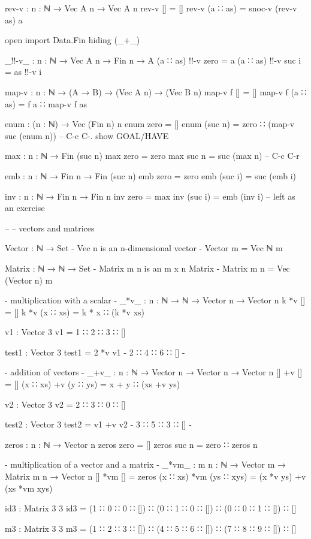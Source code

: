 rev-v : {n : ℕ} → Vec A n → Vec A n
rev-v [] = []
rev-v (a ∷ as) = snoc-v (rev-v as) a

open import Data.Fin hiding (_+_)

_!!-v_ : {n : ℕ} → Vec A n → Fin n → A
(a ∷ as) !!-v zero = a
(a ∷ as) !!-v suc i = as !!-v i

map-v : {n : ℕ} → (A → B) → (Vec A n) → (Vec B n)
map-v f [] = []
map-v f (a ∷ as) = f a ∷ map-v f as

enum : (n : ℕ) → Vec (Fin n) n
enum zero = []
enum (suc n) = zero ∷ (map-v suc (enum n)) -- C-c C-. show GOAL/HAVE

max : {n : ℕ} → Fin (suc n)
max {zero} = zero
max {suc n} = suc (max {n}) -- C-c C-r

emb : {n : ℕ} → Fin n → Fin (suc n)
emb zero = zero
emb (suc i) = suc (emb i)

inv : {n : ℕ} → Fin n → Fin n
inv zero = max
inv (suc i) = emb (inv i) -- left as an exercise

--
-- vectors and matrices 

Vector : ℕ → Set {- Vec n is an n-dimensional vector -}
Vector m = Vec ℕ m

Matrix : ℕ → ℕ → Set {- Matrix m n is an m x n Matrix -}
Matrix m n = Vec (Vector n) m

{- multiplication with a scalar -}
_*v_ : {n : ℕ} → ℕ → Vector n → Vector n
k *v [] = []
k *v (x ∷ xs) = k * x ∷ (k *v xs)

v1 : Vector 3
v1 = 1 ∷ 2 ∷ 3 ∷ []

test1 : Vector 3
test1 = 2 *v v1
{- 2 ∷ 4 ∷ 6 ∷ [] -}

{- addition of vectors -}
_+v_ : {n : ℕ} → Vector n → Vector n → Vector n
[] +v [] = []
(x ∷ xs) +v (y ∷ ys) = x + y ∷  (xs +v ys)

v2 : Vector 3
v2 = 2 ∷ 3 ∷ 0 ∷ []

test2 : Vector 3
test2 = v1 +v v2
{- 3 ∷ 5 ∷ 3 ∷ [] -}

zeros : {n : ℕ} → Vector n
zeros {zero} = []
zeros {suc n} = zero ∷ zeros {n}

{- multiplication of a vector and a matrix -}
_*vm_ : {m n : ℕ} → Vector m → Matrix m n → Vector n
[] *vm [] = zeros
(x ∷ xs) *vm (ys ∷ xys) = (x *v ys) +v (xs *vm xys)

id3 : Matrix 3 3
id3 = (1 ∷ 0 ∷ 0 ∷ []) 
    ∷ (0 ∷ 1 ∷ 0 ∷ []) 
    ∷ (0 ∷ 0 ∷ 1 ∷ []) 
    ∷ []

m3 : Matrix 3 3
m3 =  (1 ∷ 2 ∷ 3 ∷ []) 
    ∷ (4 ∷ 5 ∷ 6 ∷ []) 
    ∷ (7 ∷ 8 ∷ 9 ∷ []) 
    ∷ []

